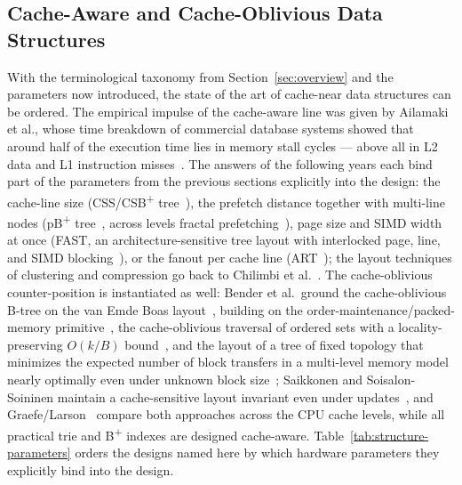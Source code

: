 \begin{nurlang}
\subsection{Cache-Aware and Cache-Oblivious Data Structures}\label{subsec:cc-structures}
With the terminological taxonomy from Section~\ref{sec:overview} and the parameters now introduced,
the state of the art of cache-near data structures can be ordered. The empirical impulse of the
cache-aware line was given by Ailamaki et al., whose time breakdown of commercial database systems
showed that around half of the execution time lies in memory stall cycles --- above all in L2 data
and L1 instruction misses~\cite{ailamaki1999dbms}. The answers of the following years each bind
part of the parameters from the previous sections explicitly into the design: the cache-line size
(CSS/CSB\textsuperscript{+} tree~\cite{rao1999css,rao2000csb}), the prefetch distance together with
multi-line nodes (pB\textsuperscript{+} tree~\cite{chen2001prefetch}, across levels fractal
prefetching~\cite{chen2002fractal}), page size and SIMD width at once (FAST, an
architecture-sensitive tree layout with interlocked page, line, and SIMD
blocking~\cite{kim2010fast}), or the fanout per cache line (ART~\cite{leis2013art}); the layout
techniques of clustering and compression go back to Chilimbi et al.~\cite{chilimbi1999layout}. The
cache-oblivious counter-position is instantiated as well: Bender et al.\ ground the cache-oblivious
B-tree on the van Emde Boas layout~\cite{bender2005coboblivious}, building on the
order-maintenance/packed-memory primitive~\cite{bender2002orderlist}, the cache-oblivious traversal
of ordered sets with a locality-preserving $O(k/B)$ bound~\cite{bender2002scanning}, and the layout
of a tree of fixed topology that minimizes the expected number of block transfers in a multi-level
memory model nearly optimally even under unknown block
size~\cite{bender2002treelayout,bender2000cobtree}; Saikkonen and Soisalon-Soininen maintain a
cache-sensitive layout invariant even under
updates~\cite{saikkonen2008multilevel,saikkonen2016layout}, and
Graefe/Larson~\cite{graefe2001btree} compare both approaches across the CPU cache levels, while all
practical trie and B\textsuperscript{+} indexes are designed cache-aware.
Table~\ref{tab:structure-parameters} orders the designs named here by which hardware parameters
they explicitly bind into the design.


\end{nurlang}
